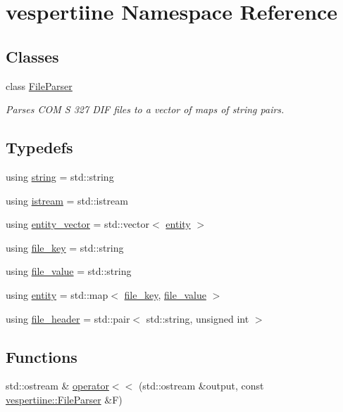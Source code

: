 \hypertarget{namespacevespertiine}{}\section{vespertiine Namespace Reference}
\label{namespacevespertiine}
\subsection*{Classes}
\begin{DoxyCompactItemize}
\item 
class \hyperlink{classvespertiine_1_1FileParser}{File\+Parser}
\begin{DoxyCompactList}\small\item\em Parses C\+OM S 327 D\+IF files to a vector of maps of string pairs. \end{DoxyCompactList}\end{DoxyCompactItemize}
\subsection*{Typedefs}
\begin{DoxyCompactItemize}
\item 
using \hyperlink{group__vespertiine_ga7e5191e67b3b71f8044b653a3f9b2065}{string} = std\+::string
\item 
using \hyperlink{group__vespertiine_ga338498d8eeb1f5a3da1f237df24c4250}{istream} = std\+::istream
\item 
using \hyperlink{group__vespertiine_ga01f4e06d9363d6dc31a69d8a0553b93d}{entity\+\_\+vector} = std\+::vector$<$ \hyperlink{group__vespertiine_gaf9205d715bdeade18d7039864ef59b44}{entity} $>$
\item 
using \hyperlink{group__vespertiine_ga39a811996b190f9e1ffa0663d4f5744a}{file\+\_\+key} = std\+::string
\item 
using \hyperlink{group__vespertiine_ga546be9d1b39ff78c5bf63e598bc51a0a}{file\+\_\+value} = std\+::string
\item 
using \hyperlink{group__vespertiine_gaf9205d715bdeade18d7039864ef59b44}{entity} = std\+::map$<$ \hyperlink{group__vespertiine_ga39a811996b190f9e1ffa0663d4f5744a}{file\+\_\+key}, \hyperlink{group__vespertiine_ga546be9d1b39ff78c5bf63e598bc51a0a}{file\+\_\+value} $>$
\item 
using \hyperlink{group__vespertiine_ga1294ff353dd9ea9b26cf4a1573db109e}{file\+\_\+header} = std\+::pair$<$ std\+::string, unsigned int $>$
\end{DoxyCompactItemize}
\subsection*{Functions}
\begin{DoxyCompactItemize}
\item 
std\+::ostream \& \hyperlink{group__vespertiine_ga1ca507e4b8f52201ba9cccaaf496e9be}{operator$<$$<$} (std\+::ostream \&output, const \hyperlink{classvespertiine_1_1FileParser}{vespertiine\+::\+File\+Parser} \&F)
\end{DoxyCompactItemize}
